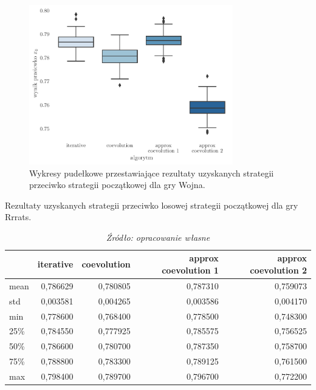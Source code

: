 \documentclass[inzynierska]{pwr_wmat_praca_dyplomowa}
\theoremstyle{plain}
\numberwithin{theorem}{chapter}
\theoremstyle{definition}
\numberwithin{theorem}{chapter}
\begin{document}
	\begin{figure}
		\centering
		\includegraphics[width=0.79\textwidth]{imagens/war_results.pdf}
		\caption{Wykresy pudełkowe przestawiające rezultaty uzyskanych strategii przeciwko strategii początkowej dla gry Wojna.}
		\label{fig:war_results}
	\end{figure}
\begin{table}
	\begin{center}
		\caption{Rezultaty uzyskanych strategii przeciwko losowej strategii początkowej dla gry Rrrats.}
		\small
		\begin{tabular}{lrrrr}
			\hline
			\toprule
			{} &  iterative &  coevolution &  approx coevolution 1 &  approx coevolution 2 \\
			\midrule
			mean  &    0,786629 &     0,780805 &             0,787310 &               0,759073 \\
			std   &    0,003581 &     0,004265 &             0,003586 &               0,004170 \\
			min   &    0,778600 &     0,768400 &             0,778500 &               0,748300 \\
			25\%   &    0,784550 &     0,777925 &             0,785575 &               0,756525 \\
			50\%   &    0,786600 &     0,780700 &             0,787350 &               0,758700 \\
			75\%   &    0,788800 &     0,783300 &             0,789125 &               0,761500 \\
			max   &    0,798400 &     0,789700 &             0,796700 &               0,772200 \\
			\bottomrule
			\hline
		\end{tabular}
		\caption*{\textit{Źródło: opracowanie własne}}
		
		\label{table:rrrats_results}
		\end{center}
	\end{table}
\end{document}
